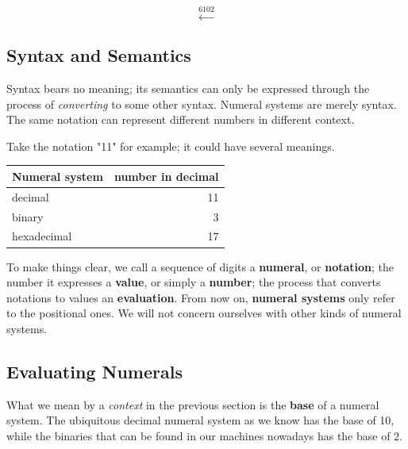 \documentclass[../thesis.tex]{subfiles}
\begin{document}
$$ \xleftarrow{6102} $$

\subsection{Syntax and Semantics}

Syntax bears no meaning;
its semantics can only be expressed through the process of \textit{converting} to some other syntax.
Numeral systems are merely syntax.
The same notation can represent different numbers in different context.

Take the notation "11" for example; it could have several meanings.

\begin{center}
    \begin{tabular}{ | l | r | }
    \textbf{Numeral system}      & \textbf{number in decimal}  \\
    \hline
    decimal             & 11    \\
    binary              & 3     \\
    hexadecimal         & 17    \\
    \end{tabular}
\end{center}

To make things clear, we call a sequence of digits a \textbf{numeral}, or \textbf{notation};
the number it expresses a \textbf{value}, or simply a \textbf{number};
the process that converts notations to values an \textbf{evaluation}.
From now on, \textbf{numeral systems} only refer to the positional ones.
We will not concern ourselves with other kinds of numeral systems.

\subsection{Evaluating Numerals}

What we mean by a \textit{context} in the previous section is the \textbf{base}
of a numeral system.
The ubiquitous decimal numeral system as we know has the base of 10,
while the binaries that can be found in our machines nowadays has the base of 2.
\end{document}
